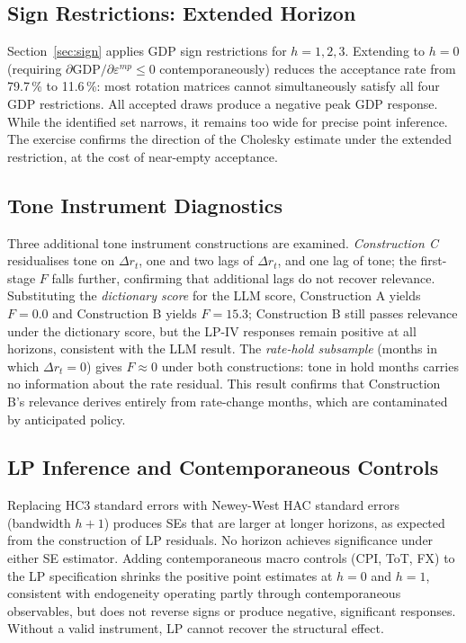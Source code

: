\documentclass[12pt,letterpaper]{article}
\begin{document}
\subsection{Sign Restrictions: Extended Horizon}
\label{app:rob:sign}

Section~\ref{sec:sign} applies GDP sign restrictions for $h=1,2,3$.
Extending to $h=0$ (requiring $\partial\text{GDP}/\partial\varepsilon^{mp}
\leq 0$ contemporaneously) reduces the acceptance rate from 79.7\,\% to
11.6\,\%: most rotation matrices cannot simultaneously satisfy all four
GDP restrictions. All accepted draws produce a negative peak GDP response.
While the identified set narrows, it remains too wide for precise point
inference. The exercise confirms the direction of the Cholesky estimate
under the extended restriction, at the cost of near-empty acceptance.

\subsection{Tone Instrument Diagnostics}
\label{app:rob:tone}

Three additional tone instrument constructions are examined.
\textit{Construction C} residualises tone on $\Delta r_t$, one and two
lags of $\Delta r_t$, and one lag of tone; the first-stage $F$ falls
further, confirming that additional lags do not recover relevance.
Substituting the \textit{dictionary score} for the LLM score,
Construction A yields $F=0.0$ and Construction B yields $F=15.3$;
Construction B still passes relevance under the dictionary score, but the
LP-IV responses remain positive at all horizons, consistent with the LLM
result. The \textit{rate-hold subsample} (months in which $\Delta r_t=0$)
gives $F\approx 0$ under both constructions: tone in hold months carries
no information about the rate residual. This result confirms that
Construction B's relevance derives entirely from rate-change months, which
are contaminated by anticipated policy.

\subsection{LP Inference and Contemporaneous Controls}
\label{app:rob:lp}

Replacing HC3 standard errors with Newey-West HAC standard errors
(bandwidth $h+1$) produces SEs that are larger at longer horizons, as
expected from the construction of LP residuals. No horizon achieves
significance under either SE estimator. Adding contemporaneous macro
controls (CPI, ToT, FX) to the LP specification shrinks the positive
point estimates at $h=0$ and $h=1$, consistent with endogeneity operating
partly through contemporaneous observables, but does not reverse signs or
produce negative, significant responses. Without a valid instrument, LP
cannot recover the structural effect.
\end{document}
